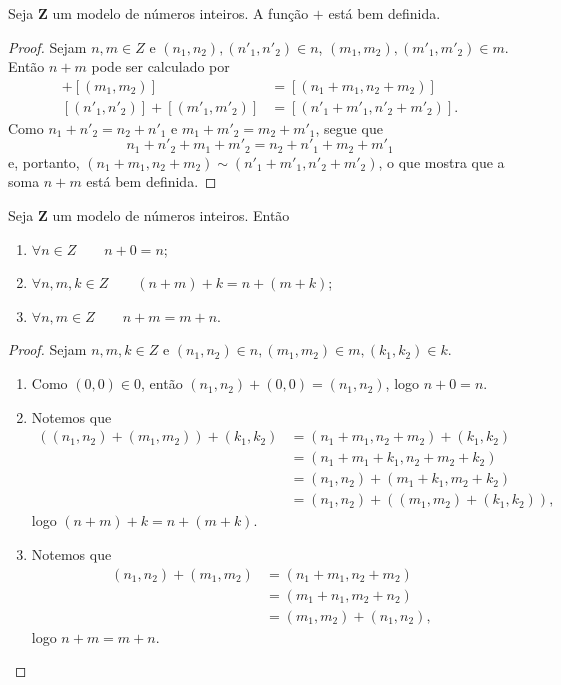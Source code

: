 \begin{theorem}
	Seja $\bm Z$ um modelo de números inteiros. A função $+$ está bem definida.
\end{theorem}
\begin{proof}
	Sejam $n,m \in Z$ e $(n_1,n_2),(n'_1,n'_2) \in n$, $(m_1,m_2),(m'_1,m'_2) \in m$. Então $n+m$ pode ser calculado por
	\begin{align*}
	[(n_1,n_2)]+[(m_1,m_2)] &= [(n_1+m_1,n_2+m_2)] \\
	[(n'_1,n'_2)]+[(m'_1,m'_2)] &= [(n'_1+m'_1,n'_2+m'_2)].
	\end{align*}
Como $n_1+n'_2=n_2+n'_1$ e $m_1+m'_2=m_2+m'_1$, segue que
	\begin{equation*}
	n_1+n'_2+m_1+m'_2=n_2+n'_1+m_2+m'_1
	\end{equation*}
e, portanto, $(n_1+m_1,n_2+m_2) \sim (n'_1+m'_1,n'_2+m'_2)$, o que mostra que a soma $n+m$ está bem definida.
\end{proof}

\begin{proposition}
	Seja $\bm Z$ um modelo de números inteiros. Então
	\begin{enumerate}
	\item $\forall n \in Z \qquad n+0=n$;
	\item $\forall n,m,k \in Z \qquad (n+m)+k=n+(m+k)$;
	\item $\forall n,m \in Z \qquad n+m=m+n$.
	\end{enumerate}
\end{proposition}
\begin{proof} Sejam $n,m,k \in Z$ e $(n_1,n_2) \in n,(m_1,m_2) \in m,(k_1,k_2) \in k$.
	\begin{enumerate}
	\item Como $(0,0) \in 0$, então $(n_1,n_2)+(0,0)=(n_1,n_2)$, logo $n+0=n$.
	
	\item Notemos que
	\begin{align*}
	((n_1,n_2)+(m_1,m_2))+(k_1,k_2) &= (n_1+m_1,n_2+m_2)+(k_1,k_2) \\
		&= (n_1+m_1+k_1,n_2+m_2+k_2) \\
		&= (n_1,n_2) +(m_1+k_1,m_2+k_2) \\
		&= (n_1,n_2) +((m_1,m_2)+(k_1,k_2)),
	\end{align*}
logo $(n+m)+k=n+(m+k)$.

	\item Notemos que
	\begin{align*}
	(n_1,n_2)+(m_1,m_2) &= (n_1+m_1,n_2+m_2) \\
	&= (m_1+n_1,m_2+n_2) \\
	&= (m_1,m_2) +(n_1,n_2),
	\end{align*}
logo $n+m=m+n$.
	\end{enumerate}
\end{proof}

